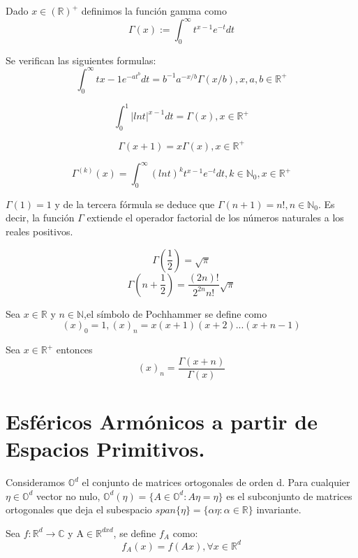 \begin{defn} Dado $x\in\mathds{(R)^+}$ definimos la función gamma como
	$$
	\Gamma(x) := \int_{0}^{\infty} t^{x-1}e^{-t}dt		
	$$
\end{defn}
\begin{prop}Se verifican las siguientes formulas:
	$$
	\int_{0}^{\infty}  t{x-1}e^{-at^b}dt = b^{-1}a^{-x/b}\Gamma(x/b)  , x,a,b \in \mathds{R}^+
	$$
	
	$$
	\int_{0}^{1} |ln t|^{x-1}dt = \Gamma(x),   x \in \mathds{R}^+
	$$
	
	$$
	\Gamma(x+1) = x \Gamma(x) ,		x\in \mathds{R}^+
	$$
	
	$$
	\Gamma^{(k)}(x) = \int_{0}^{\infty} (ln t)^k t^{x-1} e^{-t} dt,   k\in\mathds{N}_0,x\in\mathds{R}^+
	$$
\end{prop}
\begin{rem}
$\Gamma(1)=1$ y de la tercera fórmula se deduce que $\Gamma(n+1)=n!, n\in\mathds{N}_0$. Es decir, la función $\Gamma$ extiende el operador factorial de los números naturales a los reales positivos.
\end{rem}
\begin{lem} 
	$$
	\Gamma(\frac{1}{2}) = 	\sqrt{\pi}
	$$
	$$
	\Gamma(n+\frac{1}{2})=\frac{(2n)!}{2^{2n}n!} \sqrt{\pi}
	$$
\end{lem}
\begin{defn}Sea $x\in\mathds{R}$ y $n\in\mathds{N}$,el símbolo de Pochhammer se define como
	$$
	(x)_0 = 1, (x)_n=x(x+1)(x+2)...(x+n-1)
	$$
\end{defn}
\begin{prop} Sea $x\in\mathds{R}^+$ entonces
	$$
	(x)_n = \frac{\Gamma(x+n)}{\Gamma(x)}
	$$
\end{prop}

\section{Esféricos Armónicos a partir de Espacios Primitivos.}
Consideramos $\mathds{O}^d$ el conjunto de matrices ortogonales de orden d. Para cualquier $\eta \in \mathds{O}^d$ vector no nulo, $\mathds{O}^d (\eta)= \{ A \in \mathds{O}^d : A\eta = \eta \} $ es el subconjunto de matrices ortogonales que deja el subespacio $span\{\eta\} = \{\alpha \eta : \alpha \in \mathds{R}\}$ invariante.

\begin{defn}
	Sea $f:\mathds{R}^d \to \mathds{C}$ y A$ \in \mathds{R}^{dxd}$, se define $f_A$ como:
	$$
	f_A(x)=f(Ax)   , \forall x \in \mathds{R}^d
	$$
\end{defn}

